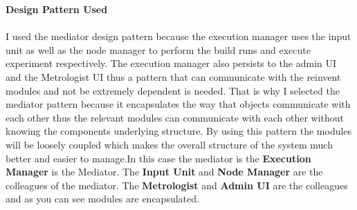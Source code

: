     \par{\textbf{Design Pattern Used} \\ \\
	I used the mediator design pattern because the execution manager uses the input unit as well as the node manager to perform the build runs and execute experiment respectively. The execution manager also persists to the admin UI and the Metrologist UI thus a pattern that can communicate with the reinvent modules and not be extremely dependent is needed. That is why I selected the mediator pattern because it encapsulates the way that objects communicate with each other thus the relevant modules can communicate with each other without knowing the components underlying structure. By using this pattern the modules will be loosely coupled which makes the overall structure of the system much better and easier to manage.In this case the mediator is the \textbf{Execution Manager}  is the Mediator. The \textbf{Input Unit} and \textbf{Node Manager } are the colleagues of the mediator. The \textbf{Metrologist} and \textbf{Admin UI} are the colleagues and as you can see modules are encapsulated.}
		
